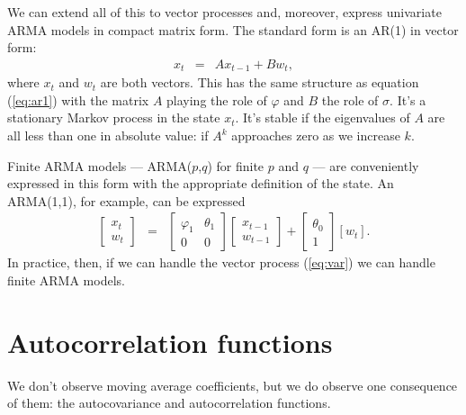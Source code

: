 \documentclass[11pt]{article}
\begin{document}
We can extend all of this to vector processes and, moreover,
express univariate ARMA models in compact matrix form.
The standard form is an AR(1) in vector form:
\begin{eqnarray}
    x_{t} &=& A x_{t-1} + B w_{t} ,
    \label{eq:var}
\end{eqnarray}
where $x_t$ and $w_t$ are both vectors.
This has the same structure as equation (\ref{eq:ar1}) with the matrix $A$
playing the role of $\varphi$ and $B$ the role of $\sigma$.
It's a stationary Markov process in the state $x_t$.
It's stable if the eigenvalues of $A$ are all less than one in absolute value:
if $A^k$ approaches zero as we increase $k$.

Finite ARMA models ---
ARMA($p$,$q$) for finite $p$ and $q$ ---
are conveniently expressed in this form with the appropriate definition
of the state.
An ARMA(1,1), for example, can be expressed
\begin{eqnarray*}
    \left[
    \begin{array}{c}
    x_t \\ w_t
    \end{array}
    \right]
    &=&
    \left[
    \begin{array}{cc}
    \varphi_1 & \theta_1 \\ 0 & 0
    \end{array}
    \right]
    \left[
    \begin{array}{c}
    x_{t-1} \\ w_{t-1}
    \end{array}
    \right]
    +
    \left[
    \begin{array}{c}
    \theta_0 \\ 1
    \end{array}
    \right]
    [w_t ] .
\end{eqnarray*}
In practice, then,
if we can handle the vector process (\ref{eq:var})
we can handle finite ARMA models.





\section{Autocorrelation functions}

We don't observe moving average coefficients,
but we do observe one consequence of them:
the autocovariance and autocorrelation functions.
\end{document}

